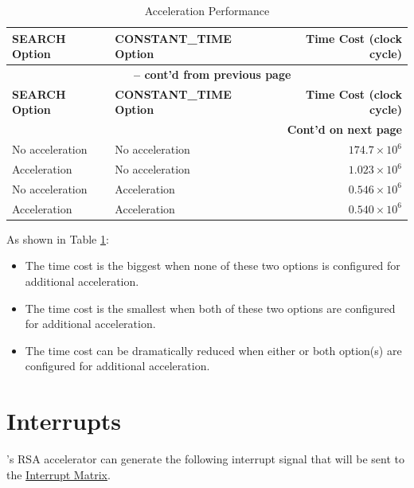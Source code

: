 \documentclass[main\_\_EN.tex]{subfiles}
\begin{document}
\begin{longtable}{ | l | l | r | }
    \caption{Acceleration Performance}\label{tab:accelerationeffect}
    \\\hline
    \rowcolor{lightgray}
        \textbf{SEARCH Option} & \textbf{CONSTANT\_TIME Option} & \textbf{Time Cost (clock cycle)}  \\ \hline
        \endfirsthead
        \multicolumn{3}{c}{\bfseries \tablename\ \thetable{} -- cont'd from previous page}\\\hline

        \rowcolor{lightgray}
        \textbf{SEARCH Option} & \textbf{CONSTANT\_TIME Option} & \textbf{Time Cost (clock cycle)}  \\ \hline
        \endhead

        \multicolumn{3}{r}{\textbf{Cont'd on next page}} \\
        \endfoot
        \endlastfoot
        \hline
    No acceleration & No acceleration   & $174.7 \times 10^6$   \\ \hline
    Acceleration     & No acceleration   & $1.023 \times 10^6$   \\ \hline
    No acceleration & Acceleration      & $0.546 \times 10^6$   \\ \hline
    Acceleration    & Acceleration      & $0.540 \times 10^6$   \\ \hline
\end{longtable}

As shown in Table \ref{tab:accelerationeffect}:

\begin{itemize}
    \item The time cost is the biggest when none of these two options is configured for additional acceleration.
    \item The time cost is the smallest when both of these two options are configured for additional acceleration.
    \item The time cost can be dramatically reduced when either or both option(s) are configured for additional acceleration.
\end{itemize}


\section{Interrupts}

\chipname{}'s RSA accelerator can generate the following interrupt signal that will be sent to the \hyperref[mod:intmtrx]{Interrupt Matrix}.
\end{document}
